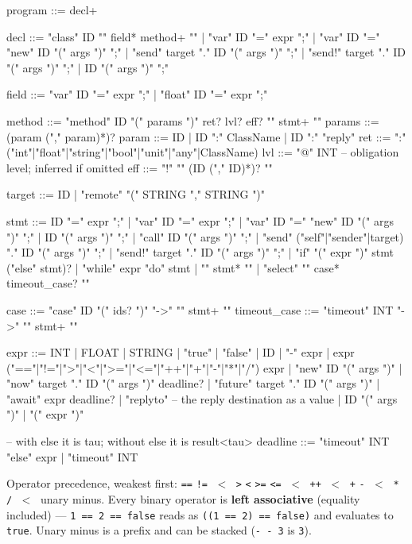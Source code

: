 \documentclass[11pt,a4paper]{article}
\begin{document}
\begin{term}
program    ::= decl+

decl       ::= "class" ID "{" field* method+ "}"
             | "var" ID "=" expr ";"
             | "var" ID "=" "new" ID "(" args ")" ";"
             | "send"  target "." ID "(" args ")" ";"
             | "send!" target "." ID "(" args ")" ";"
             | ID "(" args ")" ";"

field      ::= "var"   ID "=" expr ";"
             | "float" ID "=" expr ";"

method     ::= "method" ID "(" params ")" ret? lvl? eff? "{" stmt+ "}"
params     ::= (param ("," param)*)?
param      ::= ID | ID ":" ClassName | ID ":" "reply"
ret        ::= ":" ("int"|"float"|"string"|"bool"|"unit"|"any"|ClassName)
lvl        ::= "@" INT                    -- obligation level; inferred if omitted
eff        ::= "!" "{" (ID ("," ID)*)? "}"

target     ::= ID
             | "remote" "(" STRING "," STRING ")"

stmt       ::= ID "=" expr ";"
             | "var" ID "=" expr ";"
             | "var" ID "=" "new" ID "(" args ")" ";"
             | ID "(" args ")" ";"
             | "call" ID "(" args ")" ";"
             | "send"  ("self"|"sender"|target) "." ID "(" args ")" ";"
             | "send!" target "." ID "(" args ")" ";"
             | "if" "(" expr ")" stmt ("else" stmt)?
             | "while" expr "do" stmt
             | "{" stmt* "}"
             | "select" "{" case* timeout_case? "}"

case         ::= "case" ID "(" ids? ")" "->" "{" stmt+ "}"
timeout_case ::= "timeout" INT "->" "{" stmt+ "}"

expr       ::= INT | FLOAT | STRING | "true" | "false" | ID
             | "-" expr
             | expr ("=="|"!="|">"|"<"|">="|"<="|"++"|"+"|"-"|"*"|"/") expr
             | "new" ID "(" args ")"
             | "now" target "." ID "(" args ")" deadline?
             | "future" target "." ID "(" args ")"
             | "await" expr deadline?
             | "replyto"                  -- the reply destination as a value
             | ID "(" args ")"
             | "(" expr ")"

-- with else it is tau; without else it is result<tau>
deadline   ::= "timeout" INT "else" expr
             | "timeout" INT
\end{term}

Operator precedence, weakest first:
\texttt{==} \texttt{!=} $\;<\;$
\texttt{>} \texttt{<} \texttt{>=} \texttt{<=} $\;<\;$
\texttt{++} $\;<\;$
\texttt{+} \texttt{-} $\;<\;$
\texttt{*} \texttt{/} $\;<\;$ unary minus. Every binary operator is
\textbf{left associative} (equality included) --- \texttt{1 == 2 == false}
reads as \texttt{((1 == 2) == false)} and evaluates to \texttt{true}. Unary
minus is a prefix and can be stacked (\texttt{- - 3} is \texttt{3}).
\end{document}
